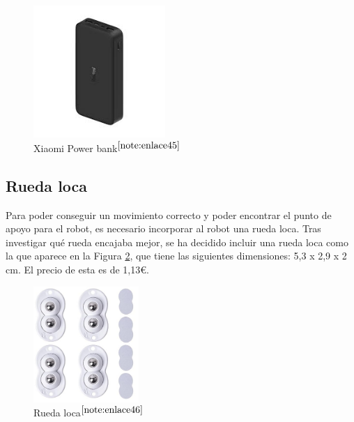\begin{figure} [h!]
	\begin{center}
		\includegraphics[width=5cm]{figs/powerbank.png}
	\end{center}
	\caption{Xiaomi Power bank$^{\ref{note:enlace45}}$} 
	\label{fig:powerbank}
\end{figure}

\setcounter{footnote}{45} %

\subsection{Rueda loca}

Para poder conseguir un movimiento correcto y poder encontrar el punto de apoyo para el robot, es necesario incorporar al robot una rueda loca. Tras investigar qué rueda encajaba mejor, se ha decidido incluir una rueda loca como la que aparece en la Figura \ref{fig:ruedaloca}, que tiene las siguientes dimensiones: 5,3 x 2,9 x 2 cm. El precio de esta es de 1,13€.

\begin{figure} [h!]
	\begin{center}
		\includegraphics[width=4cm]{figs/ruedaloca.png}
	\end{center}
	\caption{Rueda loca$^{\ref{note:enlace46}}$} 
	\label{fig:ruedaloca}
\end{figure}

